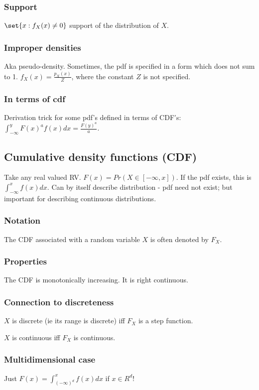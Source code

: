 \documentclass[oneside, article]{memoir}
\begin{document}
\subsubsection{Support}
$\set{x: f_X(x) \neq 0}$ support of the distribution of $X$.

\subsubsection{Improper densities}
Aka pseudo-density. Sometimes, the pdf is specified in a form which does not sum to 1. $f_X(x) = \frac{p_X(x)}{Z}$, where the constant $Z$ is not specified.

\subsubsection{In terms of cdf}
Derivation trick for some pdf's defined in terms of CDF's:\\ $\int_{-\infty}^{y} F(x)^{a} f(x)dx =  \frac{F(y)^{a}}{a}$.

\subsection{Cumulative density functions (CDF)}
Take any real valued RV. $F(x) = Pr(X \in [-\infty, x])$. If the pdf exists, this is $\int_{-\infty}^{x} f(x) dx$. Can by itself describe distribution - pdf need not exist; but important for describing continuous distributions.

\subsubsection{Notation}
The CDF associated with a random variable $X$ is often denoted by $F_X$.

\subsubsection{Properties}
The CDF is monotonically increasing. It is right continuous.

\subsubsection{Connection to discreteness}
$X$ is discrete (ie its range is discrete) iff $F_X$ is a step function.

$X$ is continuous iff $F_X$ is continuous.

\subsubsection{Multidimensional case}
Just $F(x) = \int_{(-\infty)^{d}}^{x} f(x) dx$ if $x\in R^{d}$!
\end{document}
